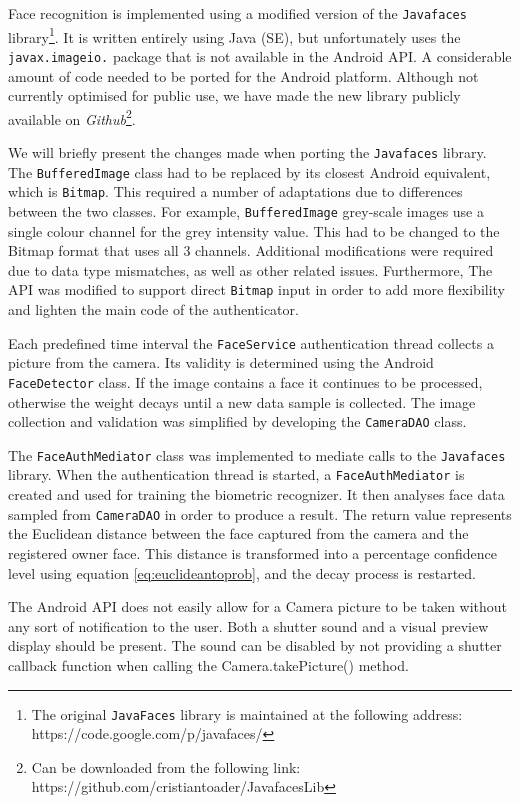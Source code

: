 Face recognition is implemented using a modified version of the {\tt Javafaces} library\footnote{The original {\tt JavaFaces} library is maintained at the following address: https://code.google.com/p/javafaces/}. It is written entirely using Java (SE), but unfortunately uses the {\tt javax.imageio.} package that is not available in the Android API. A considerable amount of code needed to be ported for the Android platform. Although not currently optimised for public use, we have made the new library publicly available on {\em Github}\footnote{Can be downloaded from the following link: https://github.com/cristiantoader/JavafacesLib}.

We will briefly present the changes made when porting the {\tt Javafaces} library. The {\tt BufferedImage} class had to be replaced by its closest Android equivalent, which is {\tt Bitmap}. This required a number of adaptations due to differences between the two classes. For example, {\tt BufferedImage} grey-scale images use a single colour channel for the grey intensity value. This had to be changed to the Bitmap format that uses all 3 channels. Additional modifications were required due to data type mismatches, as well as other related issues. Furthermore, The API was modified to support direct {\tt Bitmap} input in order to add more flexibility and lighten the main code of the authenticator. 

Each predefined time interval the {\tt FaceService} authentication thread collects a picture from the camera. Its validity is determined using the Android {\tt FaceDetector} class. If the image contains a face it continues to be processed, otherwise the weight decays until a new data sample is collected. The image collection and validation was simplified by developing the {\tt CameraDAO} class.

The {\tt FaceAuthMediator} class was implemented to mediate calls to the {\tt Javafaces} library. When the authentication thread is started, a {\tt FaceAuthMediator} is created and used for training the biometric recognizer. It then analyses face data sampled from {\tt CameraDAO} in order to produce a result. The return value represents the Euclidean distance between the face captured from the camera and the registered owner face. This distance is transformed into a percentage confidence level using equation \ref{eq:euclideantoprob}, and the decay process is restarted.  

The Android API does not easily allow for a Camera picture to be taken without any sort of notification to the user. Both a shutter sound and a visual preview display should be present. The sound can be disabled by not providing a shutter callback function when calling the Camera.takePicture() method. 

